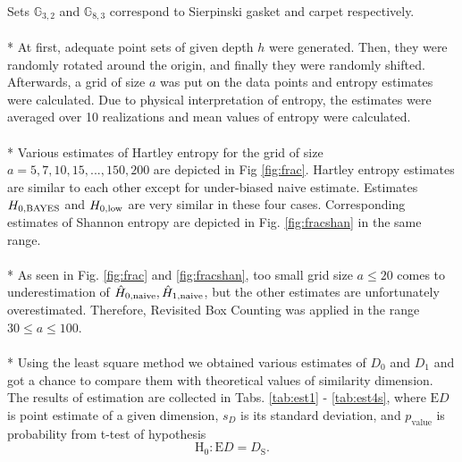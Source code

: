 Sets $\mathbb{G}_{3,2}$ and $\mathbb{G}_{8,3}$ correspond to Sierpinski gasket and carpet respectively. \\
\\*
At first, adequate point sets of given depth $h$ were generated. Then, they were randomly rotated around the origin, and finally they were randomly shifted. Afterwards, a grid of size $a$ was put on the data points and entropy estimates were calculated. Due to physical interpretation of entropy, the estimates were averaged over 10 realizations and mean values of entropy were calculated. \\
\\*
Various estimates of Hartley entropy for the grid of size $a=5,7,10,15,...,150,200$ are depicted in Fig \ref{fig:frac}. Hartley entropy estimates are similar to each other except for under-biased naive estimate. Estimates $H_{0,\mbox{\scriptsize{BAYES}}}$ and $H_{0,\mbox{\scriptsize{low}}}$ are very similar in these four cases. Corresponding estimates of Shannon entropy are depicted in Fig. \ref{fig:fracshan} in the same range. \\
\\*
As seen in Fig. \ref{fig:frac} and \ref{fig:fracshan}, too small grid size $a \leq 20$ comes to underestimation of $\hat{H}_{0,\mbox{\scriptsize{naive}}}, \hat{H}_{1,\mbox{\scriptsize{naive}}}$, but the other estimates are unfortunately overestimated. Therefore, Revisited Box Counting was applied in the range $30 \leq a \leq 100$.\\
\\*
Using the least square method we obtained various estimates of $D_{0}$ and $D_{1}$ and got a chance to compare them with theoretical values of similarity dimension. The results of estimation are collected in Tabs. \ref{tab:est1} - \ref{tab:est4s}, where $\text{E}D$ is point estimate of a given dimension, $s_{D}$ is its standard deviation, and $p_{\text{value}}$ is probability from t-test of hypothesis
\begin{equation} 
\label{eq:hypo}
\text{H}_{0} : \text{E}D = D_{\text{S}}.
\end{equation}